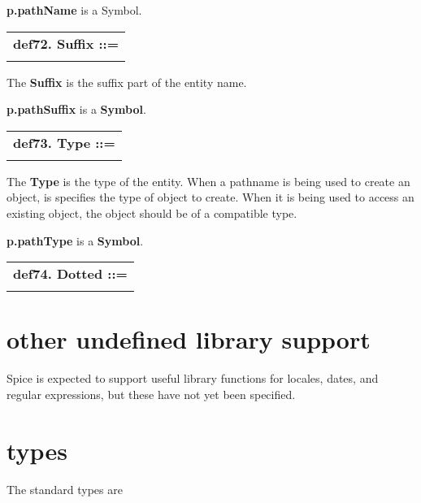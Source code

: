 \documentclass{report}
\begin{document}
{\bf p.pathName} is a Symbol.

\begin{tabular}{l}
{\bf def72. Suffix ::= }\\ 
\hspace*{3mm}{\tt "." Word} \\ 
\end{tabular}



The {\bf Suffix} is the suffix part of the entity name.

{\bf p.pathSuffix} is a {\bf Symbol}.

\begin{tabular}{l}
{\bf def73. Type ::= }\\ 
\hspace*{3mm}{\tt ";" Word} \\ 
\end{tabular}



The {\bf Type} is the type of the entity. When a pathname is being used to create
an object, is specifies the type of object to create. When it is being used
to access an existing object, the object should be of a compatible type.

{\bf p.pathType} is a {\bf Symbol}.

\begin{tabular}{l}
{\bf def74. Dotted ::= }\\ 
\hspace*{3mm}{\tt Word++ "."} \\ 
\end{tabular}



\section{other undefined library support}


Spice is expected to support useful library functions for locales, dates, and
regular expressions, but these have not yet been specified.

\section{types}


The standard types are
\end{document}
